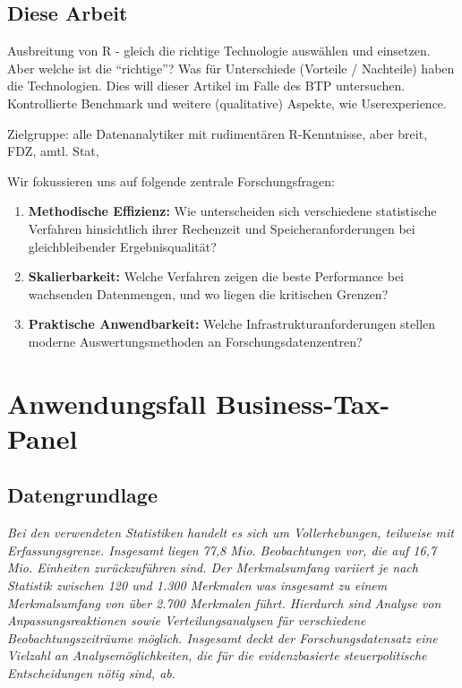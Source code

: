 \documentclass[
  german,
  10pt,
  twoside]{article}
\begin{document}
\subsection{Diese Arbeit}\label{diese-arbeit}

Ausbreitung von R - gleich die richtige Technologie auswählen und
einsetzen. Aber welche ist die ``richtige''? Was für Unterschiede
(Vorteile / Nachteile) haben die Technologien. Dies will dieser Artikel
im Falle des BTP untersuchen. Kontrollierte Benchmark und weitere
(qualitative) Aspekte, wie Userexperience.

Zielgruppe: alle Datenanalytiker mit rudimentären R-Kenntnisse, aber
breit, FDZ, amtl. Stat,

Wir fokussieren uns auf folgende zentrale Forschungsfragen:

\begin{enumerate}
\def\labelenumi{\arabic{enumi}.}
\item
  \textbf{Methodische Effizienz:} Wie unterscheiden sich verschiedene
  statistische Verfahren hinsichtlich ihrer Rechenzeit und
  Speicheranforderungen bei gleichbleibender Ergebnisqualität?
\item
  \textbf{Skalierbarkeit:} Welche Verfahren zeigen die beste Performance
  bei wachsenden Datenmengen, und wo liegen die kritischen Grenzen?
\item
  \textbf{Praktische Anwendbarkeit:} Welche Infrastrukturanforderungen
  stellen moderne Auswertungsmethoden an Forschungsdatenzentren?
\end{enumerate}

\section{Anwendungsfall
Business-Tax-Panel}\label{anwendungsfall-business-tax-panel}

\subsection{Datengrundlage}\label{datengrundlage}

\emph{Bei den verwendeten Statistiken handelt es sich um Vollerhebungen,
teilweise mit Erfassungsgrenze. Insgesamt liegen 77,8 Mio. Beobachtungen
vor, die auf 16,7 Mio. Einheiten zurückzuführen sind. Der Merkmalsumfang
variiert je nach Statistik zwischen 120 und 1.300 Merkmalen was
insgesamt zu einem Merkmalsumfang von über 2.700 Merkmalen führt.
Hierdurch sind Analyse von Anpassungsreaktionen sowie
Verteilungsanalysen für verschiedene Beobachtungszeiträume möglich.
Insgesamt deckt der Forschungsdatensatz eine Vielzahl an
Analysemöglichkeiten, die für die evidenzbasierte steuerpolitische
Entscheidungen nötig sind, ab.}
\end{document}

